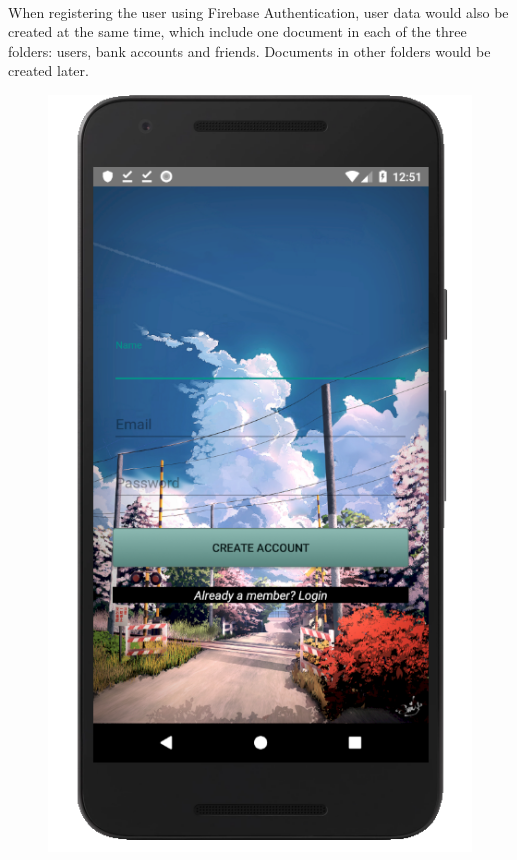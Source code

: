 \documentclass[12pt]{article}
\begin{document}
\paragraph{}
When registering the user using Firebase Authentication, user data would also be created at the same time, which include one document in each of the three folders: users, bank accounts and friends. Documents in other folders would be created later.
\begin{figure}
	\centering
	\includegraphics[scale=0.25]{RegisterActivity.png}

\end{figure}
\end{document}
